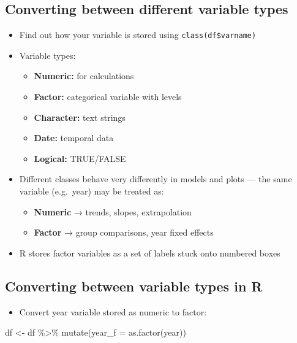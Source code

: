 \documentclass[
  letterpaper,
  DIV=11,
  numbers=noendperiod]{scrartcl}
\newenvironment{Shaded}{\begin{snugshade}}{\end{snugshade}}
\newcommand{\AttributeTok}[1]{\textcolor[rgb]{0.40,0.45,0.13}{#1}}
\newcommand{\FunctionTok}[1]{\textcolor[rgb]{0.28,0.35,0.67}{#1}}
\newcommand{\NormalTok}[1]{\textcolor[rgb]{0.00,0.23,0.31}{#1}}
\newcommand{\OtherTok}[1]{\textcolor[rgb]{0.00,0.23,0.31}{#1}}
\newcommand{\SpecialCharTok}[1]{\textcolor[rgb]{0.37,0.37,0.37}{#1}}
\providecommand{\tightlist}{%
  \setlength{\itemsep}{0pt}\setlength{\parskip}{0pt}}
\begin{document}
\subsection{Converting between different variable
types}\label{converting-between-different-variable-types}

\begin{itemize}
\tightlist
\item
  Find out how your variable is stored using \texttt{class(df\$varname)}
\item
  Variable types:

  \begin{itemize}
  \tightlist
  \item
    \textbf{Numeric:} for calculations
  \item
    \textbf{Factor:} categorical variable with levels
  \item
    \textbf{Character:} text strings
  \item
    \textbf{Date:} temporal data
  \item
    \textbf{Logical:} TRUE/FALSE
  \end{itemize}
\item
  Different classes behave very differently in models and plots --- the
  same variable (e.g.~year) may be treated as:

  \begin{itemize}
  \tightlist
  \item
    \textbf{Numeric} → trends, slopes, extrapolation
  \item
    \textbf{Factor} → group comparisons, year fixed effects
  \end{itemize}
\item
  R stores factor variables as a set of labels stuck onto numbered boxes
\end{itemize}

\subsection{Converting between variable types in
R}\label{converting-between-variable-types-in-r}

\begin{itemize}
\tightlist
\item
  Convert year variable stored as numeric to factor:
\end{itemize}

\begin{Shaded}
\begin{Highlighting}[]
\NormalTok{df }\OtherTok{\textless{}{-}}\NormalTok{ df }\SpecialCharTok{\%\textgreater{}\%} \FunctionTok{mutate}\NormalTok{(}\AttributeTok{year\_f =} \FunctionTok{as.factor}\NormalTok{(year))}
\end{Highlighting}
\end{Shaded}
\end{document}
